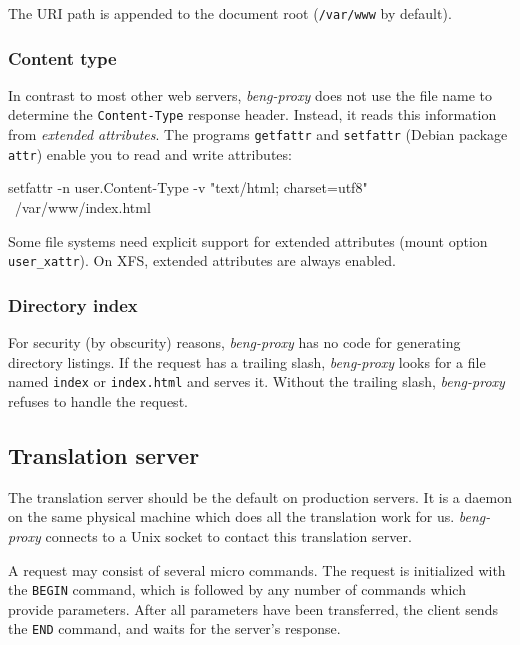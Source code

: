 \documentclass[a4paper,12pt]{article}
\begin{document}
The URI path is appended to the document root (\texttt{/var/www} by
default).

\subsubsection{Content type}
\label{xattr}

In contrast to most other web servers, \emph{beng-proxy} does not use
the file name to determine the \texttt{Content-Type} response header.
Instead, it reads this information from \textit{extended attributes}.
The programs \texttt{getfattr} and \texttt{setfattr} (Debian package
\texttt{attr}) enable you to read and write attributes:

\begin{verbatim*}
setfattr -n user.Content-Type -v "text/html; charset=utf8" \
/var/www/index.html
\end{verbatim*}

Some file systems need explicit support for extended attributes (mount
option \texttt{user\_xattr}).  On
XFS, extended attributes are always enabled.

\subsubsection{Directory index}

For security (by obscurity) reasons, \emph{beng-proxy} has no code for
generating directory listings.  If the request has a trailing slash,
\emph{beng-proxy} looks for a file named \texttt{index} or
\texttt{index.html} and serves it.  Without the trailing slash,
\emph{beng-proxy} refuses to handle the request.


\subsection{Translation server}

The translation server should be the default on production servers.
It is a daemon on the same physical machine which does all the
translation work for us.  \emph{beng-proxy} connects to a Unix socket
to contact this translation server.

A request may consist of several micro commands.  The request is
initialized with the \texttt{BEGIN} command, which is followed by any
number of commands which provide parameters.  After all parameters
have been transferred, the client sends the \texttt{END} command,
and waits for the server's response.
\end{document}
